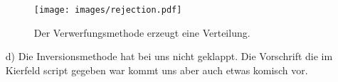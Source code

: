 \begin{itemize}
      \begin{figure}
        \centering
        \texttt{[image: images/rejection.pdf]}
        \caption{Der Verwerfungsmethode erzeugt eine Verteilung.}
      \end{figure}
      \FloatBarrier
      \item[d)]
      Die Inversionsmethode hat bei uns nicht geklappt. Die Vorschrift die im Kierfeld script gegeben war kommt uns aber auch etwas komisch vor.
    \end{itemize}
\label{sec:auswertung}
